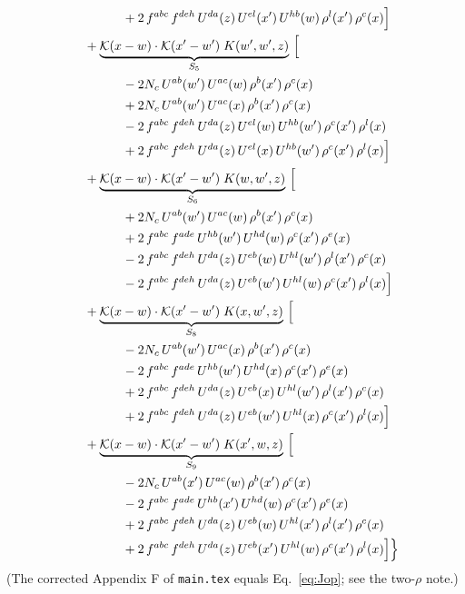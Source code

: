 \documentclass[10pt]{article}
\numberwithin{equation}{section}
\newcommand{\KK}{\mathcal K}
\begin{document}
\begin{align}
&\qquad\qquad +2\,f^{abc}\,f^{deh}\,U^{da}(z)\,U^{el}(x')\,U^{hb}(w)\,\rho^{l}(x')\,\rho^{c}(x)\Big]\notag\\
&\quad +\underbrace{\KK(x-w)\cdot\KK(x'-w')\;K(w',w',z)}_{S_{5}}\,\Big[\notag\\
&\qquad\qquad - 2 N_c\,U^{ab}(w')\,U^{ac}(w)\,\rho^{b}(x')\,\rho^{c}(x)\notag\\
&\qquad\qquad +2 N_c\,U^{ab}(w')\,U^{ac}(x)\,\rho^{b}(x')\,\rho^{c}(x)\notag\\
&\qquad\qquad -2\,f^{abc}\,f^{deh}\,U^{da}(z)\,U^{el}(w)\,U^{hb}(w')\,\rho^{c}(x')\,\rho^{l}(x)\notag\\
&\qquad\qquad +2\,f^{abc}\,f^{deh}\,U^{da}(z)\,U^{el}(x)\,U^{hb}(w')\,\rho^{c}(x')\,\rho^{l}(x)\Big]\notag\\
&\quad +\underbrace{\KK(x-w)\cdot\KK(x'-w')\;K(w,w',z)}_{S_{6}}\,\Big[\notag\\
&\qquad\qquad +2 N_c\,U^{ab}(w')\,U^{ac}(w)\,\rho^{b}(x')\,\rho^{c}(x)\notag\\
&\qquad\qquad +2\,f^{abc}\,f^{ade}\,U^{hb}(w')\,U^{hd}(w)\,\rho^{c}(x')\,\rho^{e}(x)\notag\\
&\qquad\qquad -2\,f^{abc}\,f^{deh}\,U^{da}(z)\,U^{eb}(w)\,U^{hl}(w')\,\rho^{l}(x')\,\rho^{c}(x)\notag\\
&\qquad\qquad -2\,f^{abc}\,f^{deh}\,U^{da}(z)\,U^{eb}(w')\,U^{hl}(w)\,\rho^{c}(x')\,\rho^{l}(x)\Big]\notag\\
&\quad +\underbrace{\KK(x-w)\cdot\KK(x'-w')\;K(x,w',z)}_{S_{8}}\,\Big[\notag\\
&\qquad\qquad - 2 N_c\,U^{ab}(w')\,U^{ac}(x)\,\rho^{b}(x')\,\rho^{c}(x)\notag\\
&\qquad\qquad -2\,f^{abc}\,f^{ade}\,U^{hb}(w')\,U^{hd}(x)\,\rho^{c}(x')\,\rho^{e}(x)\notag\\
&\qquad\qquad +2\,f^{abc}\,f^{deh}\,U^{da}(z)\,U^{eb}(x)\,U^{hl}(w')\,\rho^{l}(x')\,\rho^{c}(x)\notag\\
&\qquad\qquad +2\,f^{abc}\,f^{deh}\,U^{da}(z)\,U^{eb}(w')\,U^{hl}(x)\,\rho^{c}(x')\,\rho^{l}(x)\Big]\notag\\
&\quad +\underbrace{\KK(x-w)\cdot\KK(x'-w')\;K(x',w,z)}_{S_{9}}\,\Big[\notag\\
&\qquad\qquad - 2 N_c\,U^{ab}(x')\,U^{ac}(w)\,\rho^{b}(x')\,\rho^{c}(x)\notag\\
&\qquad\qquad -2\,f^{abc}\,f^{ade}\,U^{hb}(x')\,U^{hd}(w)\,\rho^{c}(x')\,\rho^{e}(x)\notag\\
&\qquad\qquad +2\,f^{abc}\,f^{deh}\,U^{da}(z)\,U^{eb}(w)\,U^{hl}(x')\,\rho^{l}(x')\,\rho^{c}(x)\notag\\
&\qquad\qquad +2\,f^{abc}\,f^{deh}\,U^{da}(z)\,U^{eb}(x')\,U^{hl}(w)\,\rho^{c}(x')\,\rho^{l}(x)\Big]\Big\}\label{eq:Jdecomp}
\end{align}
(The corrected Appendix F of \texttt{main.tex} equals Eq.~\eqref{eq:Jop}; see the two-$\rho$ note.)
\end{document}
